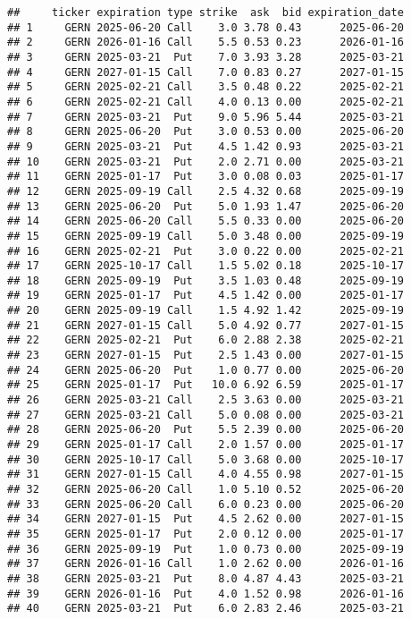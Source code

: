 \documentclass[
]{article}
\begin{document}
\begin{verbatim}
##     ticker expiration type strike  ask  bid expiration_date
## 1     GERN 2025-06-20 Call    3.0 3.78 0.43      2025-06-20
## 2     GERN 2026-01-16 Call    5.5 0.53 0.23      2026-01-16
## 3     GERN 2025-03-21  Put    7.0 3.93 3.28      2025-03-21
## 4     GERN 2027-01-15 Call    7.0 0.83 0.27      2027-01-15
## 5     GERN 2025-02-21 Call    3.5 0.48 0.22      2025-02-21
## 6     GERN 2025-02-21 Call    4.0 0.13 0.00      2025-02-21
## 7     GERN 2025-03-21  Put    9.0 5.96 5.44      2025-03-21
## 8     GERN 2025-06-20  Put    3.0 0.53 0.00      2025-06-20
## 9     GERN 2025-03-21  Put    4.5 1.42 0.93      2025-03-21
## 10    GERN 2025-03-21  Put    2.0 2.71 0.00      2025-03-21
## 11    GERN 2025-01-17  Put    3.0 0.08 0.03      2025-01-17
## 12    GERN 2025-09-19 Call    2.5 4.32 0.68      2025-09-19
## 13    GERN 2025-06-20  Put    5.0 1.93 1.47      2025-06-20
## 14    GERN 2025-06-20 Call    5.5 0.33 0.00      2025-06-20
## 15    GERN 2025-09-19 Call    5.0 3.48 0.00      2025-09-19
## 16    GERN 2025-02-21  Put    3.0 0.22 0.00      2025-02-21
## 17    GERN 2025-10-17 Call    1.5 5.02 0.18      2025-10-17
## 18    GERN 2025-09-19  Put    3.5 1.03 0.48      2025-09-19
## 19    GERN 2025-01-17  Put    4.5 1.42 0.00      2025-01-17
## 20    GERN 2025-09-19 Call    1.5 4.92 1.42      2025-09-19
## 21    GERN 2027-01-15 Call    5.0 4.92 0.77      2027-01-15
## 22    GERN 2025-02-21  Put    6.0 2.88 2.38      2025-02-21
## 23    GERN 2027-01-15  Put    2.5 1.43 0.00      2027-01-15
## 24    GERN 2025-06-20  Put    1.0 0.77 0.00      2025-06-20
## 25    GERN 2025-01-17  Put   10.0 6.92 6.59      2025-01-17
## 26    GERN 2025-03-21 Call    2.5 3.63 0.00      2025-03-21
## 27    GERN 2025-03-21 Call    5.0 0.08 0.00      2025-03-21
## 28    GERN 2025-06-20  Put    5.5 2.39 0.00      2025-06-20
## 29    GERN 2025-01-17 Call    2.0 1.57 0.00      2025-01-17
## 30    GERN 2025-10-17 Call    5.0 3.68 0.00      2025-10-17
## 31    GERN 2027-01-15 Call    4.0 4.55 0.98      2027-01-15
## 32    GERN 2025-06-20 Call    1.0 5.10 0.52      2025-06-20
## 33    GERN 2025-06-20 Call    6.0 0.23 0.00      2025-06-20
## 34    GERN 2027-01-15  Put    4.5 2.62 0.00      2027-01-15
## 35    GERN 2025-01-17  Put    2.0 0.12 0.00      2025-01-17
## 36    GERN 2025-09-19  Put    1.0 0.73 0.00      2025-09-19
## 37    GERN 2026-01-16 Call    1.0 2.62 0.00      2026-01-16
## 38    GERN 2025-03-21  Put    8.0 4.87 4.43      2025-03-21
## 39    GERN 2026-01-16  Put    4.0 1.52 0.98      2026-01-16
## 40    GERN 2025-03-21  Put    6.0 2.83 2.46      2025-03-21

\end{verbatim}
\end{document}
